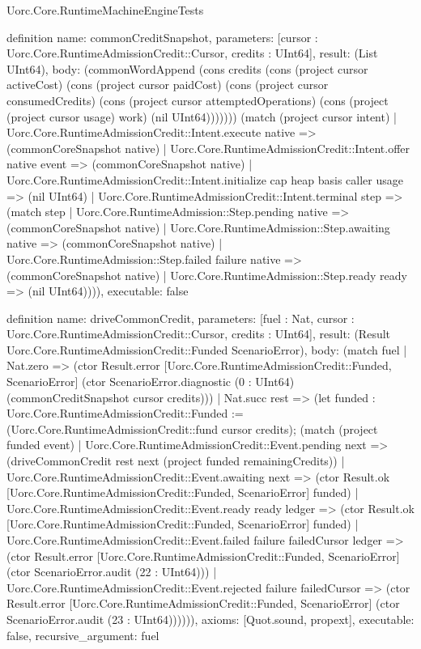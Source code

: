 \begin{lexlean}{Uorc.Core.RuntimeMachineEngineTests}
\begin{semanticmodule}
definition{
  name: commonCreditSnapshot,
  parameters: [cursor : Uorc.Core.RuntimeAdmissionCredit::Cursor, credits : UInt64],
  result: (List UInt64),
  body: (commonWordAppend (cons credits (cons (project cursor activeCost) (cons (project cursor paidCost) (cons (project cursor consumedCredits) (cons (project cursor attemptedOperations) (cons (project (project cursor usage) work) (nil UInt64))))))) (match (project cursor intent)
    | Uorc.Core.RuntimeAdmissionCredit::Intent.execute native => (commonCoreSnapshot native)
    | Uorc.Core.RuntimeAdmissionCredit::Intent.offer native event => (commonCoreSnapshot native)
    | Uorc.Core.RuntimeAdmissionCredit::Intent.initialize cap heap basis caller usage => (nil UInt64)
    | Uorc.Core.RuntimeAdmissionCredit::Intent.terminal step => (match step
      | Uorc.Core.RuntimeAdmission::Step.pending native => (commonCoreSnapshot native)
      | Uorc.Core.RuntimeAdmission::Step.awaiting native => (commonCoreSnapshot native)
      | Uorc.Core.RuntimeAdmission::Step.failed failure native => (commonCoreSnapshot native)
      | Uorc.Core.RuntimeAdmission::Step.ready ready => (nil UInt64)))),
  executable: false
}

definition{
  name: driveCommonCredit,
  parameters: [fuel : Nat, cursor : Uorc.Core.RuntimeAdmissionCredit::Cursor, credits : UInt64],
  result: (Result Uorc.Core.RuntimeAdmissionCredit::Funded ScenarioError),
  body: (match fuel
    | Nat.zero => (ctor Result.error [Uorc.Core.RuntimeAdmissionCredit::Funded, ScenarioError] (ctor ScenarioError.diagnostic (0 : UInt64) (commonCreditSnapshot cursor credits)))
    | Nat.succ rest => (let funded : Uorc.Core.RuntimeAdmissionCredit::Funded := (Uorc.Core.RuntimeAdmissionCredit::fund cursor credits); (match (project funded event)
      | Uorc.Core.RuntimeAdmissionCredit::Event.pending next => (driveCommonCredit rest next (project funded remainingCredits))
      | Uorc.Core.RuntimeAdmissionCredit::Event.awaiting next => (ctor Result.ok [Uorc.Core.RuntimeAdmissionCredit::Funded, ScenarioError] funded)
      | Uorc.Core.RuntimeAdmissionCredit::Event.ready ready ledger => (ctor Result.ok [Uorc.Core.RuntimeAdmissionCredit::Funded, ScenarioError] funded)
      | Uorc.Core.RuntimeAdmissionCredit::Event.failed failure failedCursor ledger => (ctor Result.error [Uorc.Core.RuntimeAdmissionCredit::Funded, ScenarioError] (ctor ScenarioError.audit (22 : UInt64)))
      | Uorc.Core.RuntimeAdmissionCredit::Event.rejected failure failedCursor => (ctor Result.error [Uorc.Core.RuntimeAdmissionCredit::Funded, ScenarioError] (ctor ScenarioError.audit (23 : UInt64)))))),
  axioms: [Quot.sound, propext],
  executable: false,
  recursive_argument: fuel
}


\end{semanticmodule}
\end{lexlean}
